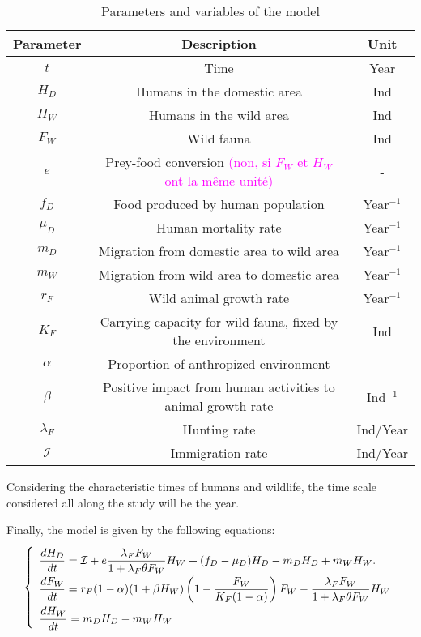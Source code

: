 \documentclass{article}
\newcommand{\lfw}{\lambda_{F}}
\newcommand{\lfw}{\lambda_{F}}
\newcommand{\cI}{\mathcal{I}}
\newcommand{\YD}[1]{\textcolor{magenta}{#1}}
\begin{document}
\begin{table}[ht]
\center
\begin{tabular}{|c|c|c|}
\hline 
Parameter & Description & Unit \\ 
\hline \hline
$t$ & Time & Year \\
\hline
$H_D$ & Humans in the domestic area & Ind \\
$H_W$ & Humans in the wild area & Ind \\
$F_W$ & Wild fauna & Ind \\
\hline
$e$ & Prey-food conversion \YD{(non, si $F_W$ et $H_W$ ont la même unité)} & - \\
$f_D$ & Food produced by human population & Year$^{-1}$ \\
$\mu_D$ & Human mortality rate  & Year$^{-1}$ \\
$m_D$ & Migration from domestic area to wild area & Year$^{-1}$ \\
$m_W$ & Migration from wild area to domestic area & Year$^{-1}$ \\
$r_F$ & Wild animal growth rate & Year$^{-1}$ \\
$K_F$ & Carrying capacity for wild fauna, fixed by the environment& Ind \\
$\alpha$ & Proportion of anthropized environment & - \\
$\beta$ & Positive impact from human activities to animal growth rate & Ind$^{-1}$  \\
$\lfw$ & Hunting rate & Ind/Year\\
$\mathcal{I}$ & Immigration rate &Ind/Year\\
\hline
\end{tabular}
\caption{Parameters and variables of the model}
\end{table}

Considering the characteristic times of humans and wildlife, the time scale considered all along the study will be the year.
\medskip

Finally, the model is given by the following equations:
\begin{equation}
\def\arraystretch{2}
\left\{ 
\begin{array}{l}
\dfrac{dH_D}{dt}= \cI + e\dfrac{\lfw F_W}{1 + \lfw \theta F_W}H_W + (f_D - \mu_D) H_D - m_D H_D + m_W H_W. \\
\dfrac{dF_W}{dt} = r_F(1- \alpha) (1+ \beta H_W) \left(1 - \dfrac{F_W}{K_F(1-\alpha)} \right) F_W - \dfrac{\lfw F_W}{1 + \lfw \theta F_W} H_W \\
\dfrac{dH_W}{dt}= m_D H_D - m_W H_W 
\end{array} \right.
\label{equationsHDFWHW}
\end{equation}
\end{document}
